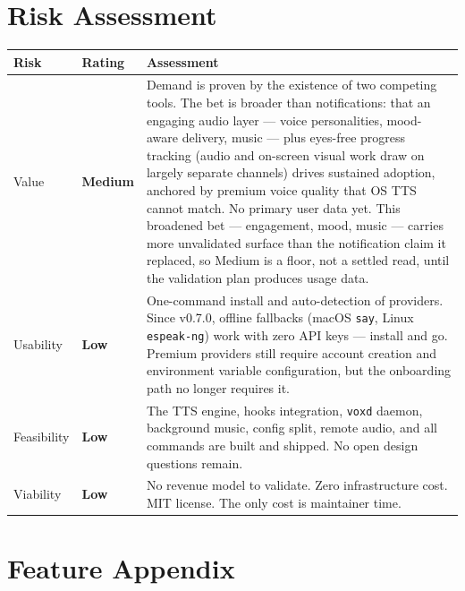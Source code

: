 \documentclass[11pt,letterpaper]{article}
\begin{document}
\newpage
\section*{Risk Assessment}

\renewcommand{\arraystretch}{1.6}
\begin{tabularx}{\textwidth}{@{} l l X @{}}
\toprule
\textbf{\color{SectionBlue}Risk} & \textbf{\color{SectionBlue}Rating} & \textbf{\color{SectionBlue}Assessment} \\
\midrule
Value      & \textcolor{RiskAmber}{\textbf{Medium}} &
  Demand is proven by the existence of two competing tools. The bet is broader
  than notifications: that an engaging audio layer --- voice personalities,
  mood-aware delivery, music --- plus eyes-free progress tracking (audio and
  on-screen visual work draw on largely separate channels) drives sustained
  adoption, anchored by premium voice quality that OS TTS cannot match. No
  primary user data yet. This broadened bet --- engagement, mood, music ---
  carries more unvalidated surface than the notification claim it replaced, so
  Medium is a floor, not a settled read, until the validation plan produces
  usage data. \\
Usability  & \textcolor{RiskGreen}{\textbf{Low}} &
  One-command install and auto-detection of providers. Since v0.7.0, offline
  fallbacks (macOS \texttt{say}, Linux \texttt{espeak-ng}) work with zero
  API keys --- install and go. Premium providers still require account
  creation and environment variable configuration, but the onboarding path
  no longer requires it. \\
Feasibility & \textcolor{RiskGreen}{\textbf{Low}} &
  The TTS engine, hooks integration, \texttt{voxd} daemon, background music,
  config split, remote audio, and all commands are built and shipped.
  No open design questions remain. \\
Viability  & \textcolor{RiskGreen}{\textbf{Low}} &
  No revenue model to validate. Zero infrastructure cost. MIT license.
  The only cost is maintainer time. \\
\bottomrule
\end{tabularx}
\renewcommand{\arraystretch}{1.0}


\newpage
\section*{Feature Appendix}
\end{document}
